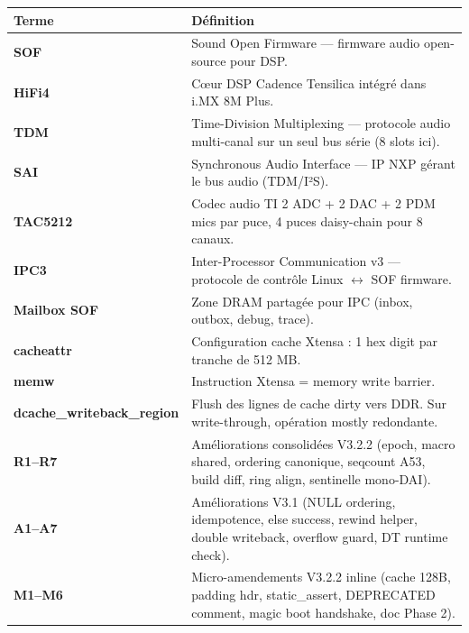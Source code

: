 \documentclass[11pt,a4paper]{article}
\begin{document}
\begin{tabularx}{\textwidth}{p{3.5cm}X}
\toprule
\textbf{Terme} & \textbf{Définition} \\
\midrule
\textbf{SOF} & Sound Open Firmware — firmware audio open-source pour DSP. \\
\textbf{HiFi4} & Cœur DSP Cadence Tensilica intégré dans i.MX 8M Plus. \\
\textbf{TDM} & Time-Division Multiplexing — protocole audio multi-canal sur un seul bus série (8 slots ici). \\
\textbf{SAI} & Synchronous Audio Interface — IP NXP gérant le bus audio (TDM/I²S). \\
\textbf{TAC5212} & Codec audio TI 2 ADC + 2 DAC + 2 PDM mics par puce, 4 puces daisy-chain pour 8 canaux. \\
\textbf{IPC3} & Inter-Processor Communication v3 — protocole de contrôle Linux $\leftrightarrow$ SOF firmware. \\
\textbf{Mailbox SOF} & Zone DRAM partagée pour IPC (inbox, outbox, debug, trace). \\
\textbf{cacheattr} & Configuration cache Xtensa : 1 hex digit par tranche de 512 MB. \\
\textbf{memw} & Instruction Xtensa = memory write barrier. \\
\textbf{dcache\_writeback\_region} & Flush des lignes de cache dirty vers DDR. Sur write-through, opération mostly redondante. \\
\textbf{R1--R7} & Améliorations consolidées V3.2.2 (epoch, macro shared, ordering canonique, seqcount A53, build diff, ring align, sentinelle mono-DAI). \\
\textbf{A1--A7} & Améliorations V3.1 (NULL ordering, idempotence, else success, rewind helper, double writeback, overflow guard, DT runtime check). \\
\textbf{M1--M6} & Micro-amendements V3.2.2 inline (cache 128B, padding hdr, static\_assert, DEPRECATED comment, magic boot handshake, doc Phase 2). \\
\bottomrule
\end{tabularx}
\end{document}

